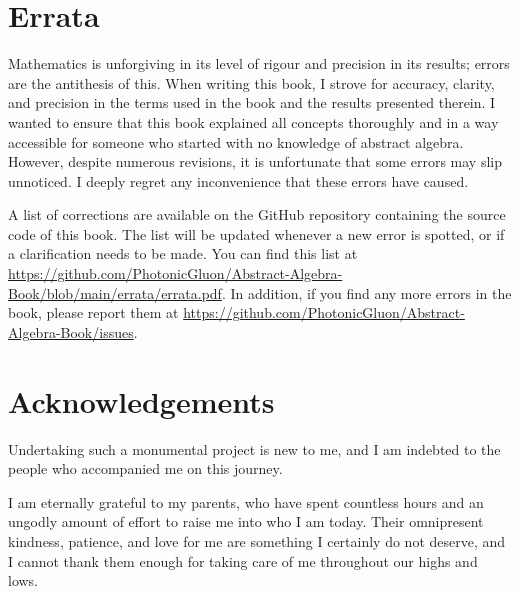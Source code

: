 \vspace*{\fill}

\begin{center}
    \fontsize{8pt}{8pt}\selectfont
\end{center}

\vspace*{2\baselineskip}
\cleardoublepage

\createtoc

\chapter{Errata}
Mathematics is unforgiving in its level of rigour and precision in its results; errors are the antithesis of this. When writing this book, I strove for accuracy, clarity, and precision in the terms used in the book and the results presented therein. I wanted to ensure that this book explained all concepts thoroughly and in a way accessible for someone who started with no knowledge of abstract algebra. However, despite numerous revisions, it is unfortunate that some errors may slip unnoticed. I deeply regret any inconvenience that these errors have caused.

A list of corrections are available on the GitHub repository containing the source code of this book. The list will be updated whenever a new error is spotted, or if a clarification needs to be made. You can find this list at \url{https://github.com/PhotonicGluon/Abstract-Algebra-Book/blob/main/errata/errata.pdf}. In addition, if you find any more errors in the book, please report them at \url{https://github.com/PhotonicGluon/Abstract-Algebra-Book/issues}.

\chapter{Acknowledgements}
Undertaking such a monumental project is new to me, and I am indebted to the people who accompanied me on this journey.

I am eternally grateful to my parents, who have spent countless hours and an ungodly amount of effort to raise me into who I am today. Their omnipresent kindness, patience, and love for me are something I certainly do not deserve, and I cannot thank them enough for taking care of me throughout our highs and lows.

